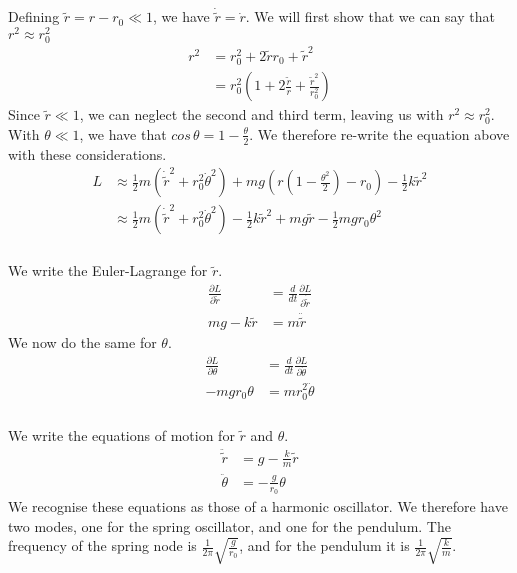 \documentclass{article}
\begin{document}
Defining $\tilde{r} = r - r_0 \ll 1$, we have $\dot{\tilde{r}} = \dot{r}$. We will first show that we can say that $r^2 \approx r_0^2$
\begin{align*}
	r^2 &= r_0^2 + 2\tilde{r}r_0 + \tilde{r}^2\\
	&= r_0^2\left( 1 + 2\frac{\tilde{r}}{r} +\frac{\tilde{r}^2}{r_0^2} \right)
\end{align*}
Since $\tilde{r} \ll 1$, we can neglect the second and third term, leaving us with $r^2 \approx r_0^2$.\\
With $\theta \ll 1$, we have that $cos\,\theta = 1 - \frac{\theta}{2}$. We therefore re-write the equation above with these considerations.
\begin{align*}
	L &\approx \frac{1}{2}m(\dot{\tilde{r}}^2 + r_0^2\dot{\theta}^2) + mg(r(1- \frac{\theta^2}{2})- r_0) - \frac{1}{2}k\tilde{r}^2\\
	&\approx \frac{1}{2}m(\dot{\tilde{r}}^2 + r_0^2\dot{\theta}^2)  - \frac{1}{2}k\tilde{r}^2 +mg\tilde{r} - \frac{1}{2}mgr_0\theta^2
\end{align*}

\subsubsection{} %

We write the Euler-Lagrange for $\tilde{r}$.
\begin{align*}
	\frac{\partial L}{\partial \tilde{r}} &= \frac{d}{dt}\frac{\partial L}{\partial \dot{\tilde{r}}}\\
	mg - k\tilde{r} &= m\ddot{\tilde{r}}
\end{align*}
We now do the same for $\theta$.
\begin{align*}
	\frac{\partial L}{\partial \theta} &= \frac{d}{dt}\frac{\partial L}{\partial \dot{\theta}}\\
	-mgr_0\theta &= mr_0^2\ddot{\theta}
\end{align*}
\subsubsection{} %

We write the equations of motion for $\tilde{r}$ and $\theta$.
\begin{align*}
	\ddot{\tilde{r}} &= g - \frac{k}{m}\tilde{r}\\
	\ddot{\theta} &= -\frac{g}{r_0}\theta
\end{align*}
We recognise these equations as those of a harmonic oscillator. We therefore have two modes, one for the spring oscillator, and one for the pendulum. The frequency of the spring node is $\frac{1}{2\pi}\sqrt{\frac{g}{r_0}}$, and for the pendulum it is $\frac{1}{2\pi}\sqrt{\frac{k}{m}}$.
\end{document}
